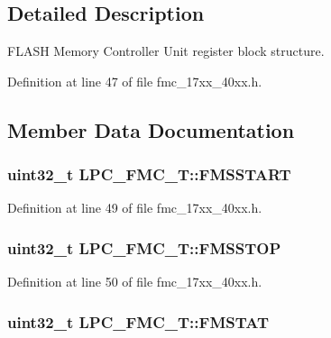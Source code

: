 \subsection{Detailed Description}
F\+L\+A\+SH Memory Controller Unit register block structure. 

Definition at line 47 of file fmc\+\_\+17xx\+\_\+40xx.\+h.



\subsection{Member Data Documentation}
\subsubsection[{\texorpdfstring{F\+M\+S\+S\+T\+A\+RT}{FMSSTART}}]{ uint32\+\_\+t L\+P\+C\+\_\+\+F\+M\+C\+\_\+\+T\+::\+F\+M\+S\+S\+T\+A\+RT}\hypertarget{structLPC__FMC__T_a9b3295a45c90bcabe879ace3d0de0ef8}{}\label{structLPC__FMC__T_a9b3295a45c90bcabe879ace3d0de0ef8}


Definition at line 49 of file fmc\+\_\+17xx\+\_\+40xx.\+h.

\subsubsection[{\texorpdfstring{F\+M\+S\+S\+T\+OP}{FMSSTOP}}]{ uint32\+\_\+t L\+P\+C\+\_\+\+F\+M\+C\+\_\+\+T\+::\+F\+M\+S\+S\+T\+OP}\hypertarget{structLPC__FMC__T_a3d484fa5da4d1e27addf19ad43b338ac}{}\label{structLPC__FMC__T_a3d484fa5da4d1e27addf19ad43b338ac}


Definition at line 50 of file fmc\+\_\+17xx\+\_\+40xx.\+h.

\subsubsection[{\texorpdfstring{F\+M\+S\+T\+AT}{FMSTAT}}]{ uint32\+\_\+t L\+P\+C\+\_\+\+F\+M\+C\+\_\+\+T\+::\+F\+M\+S\+T\+AT}\hypertarget{structLPC__FMC__T_a0ecee36dd102cfd5d4eeb3113fbf508a}{}\label{structLPC__FMC__T_a0ecee36dd102cfd5d4eeb3113fbf508a}


